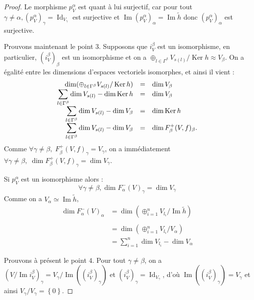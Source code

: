 \documentclass[a4paper,11pt]{article}
\DeclareMathOperator{\Ker}{Ker}
\DeclareMathOperator{\Id}{Id}
\DeclareMathOperator{\Img}{Im}
\newcommand{\dps}{\displaystyle}
\begin{document}
\begin{proof}
Le morphisme $p_{V}^{\alpha}$ est quant à lui surjectif, car pour tout $\gamma \neq \alpha, (p_{V}^{\alpha})_{\gamma} = \Id_{V_{\gamma}}$ est surjective et $ \Img (p_{V}^{\alpha})_{\alpha} = \Img \widetilde{h}$ donc $ (p_{V}^{\alpha})_{\alpha}$ est surjective.  

	Prouvons maintenant le point $3$. Supposons que $i_{V}^{\beta}$ est un isomorphisme, en particulier, $(i_{V}^{\beta})_{\beta}$ est un isomorphisme et on a $\oplus_{l\in\Gamma^{\beta}}V_{s(l)}/\Ker h\approx V_{\beta}$. On a égalité entre les dimensions d'espaces vectoriels isomorphes, et ainsi il vient :
	\[
\begin{array}{>{\dps}r>{\dps}l>{\dps}l}
	\dim(\oplus_{l\in\Gamma^{\beta}}V_{s(l)}/\Ker h) &=& \dim V_{\beta}\\
	\sum_{l\in\Gamma^{\beta}}\dim V_{s(l)}-\dim\Ker h &=& \dim V_{\beta}\\
	\sum_{l\in\Gamma^{\beta}}\dim V_{s(l)}-\dim V_{\beta} &=& \dim\Ker h\\
	\sum_{l\in\Gamma^{\beta}}\dim V_{s(l)}-\dim V_{\beta} &=& \dim F_{\beta}^{+}(V,f)_{\beta}.\\
\end{array}
	\]
	Comme $\forall \gamma\neq\beta,\;F_{\beta}^{+}(V,f)_{\gamma}=V_{\gamma}$, on a immédiatement $\forall \gamma\neq\beta,\;\dim F_{\beta}^{+}(V,f)_{\gamma}=\dim V_{\gamma}$.

        Si $p_{V}^{\alpha}$ est un isomorphisme alors : 
        \[
        \forall \gamma \neq \beta, \dim F_{\alpha}^{-}(V)_{\gamma} = \dim V_{\gamma}
        \]
        Comme on a $V_{\alpha} \simeq \Img \widetilde{h}$,
        \[
        \begin{array}{rl}
        \dim F_{\alpha}^{-}(V)_{\alpha} &= \dim\left( \oplus_{i=1}^{n} V_{l_{i}} / \Img \widetilde{h} \right) \\ \\
                                        &= \dim\left( \oplus_{i=1}^{n} V_{l_{i}} / V_{\alpha} \right) \\
                                        &= \sum_{i=1}^{n} \dim V_{l_{i}} - \dim V_{\alpha}
\end{array}
        \]


	Prouvons à présent le point $4$. Pour tout $\gamma\neq\beta$, on a $(V/\Img i_{V}^{\beta})_{\gamma}=V_{\gamma}/\Img((i_{V}^{\beta})_{\gamma})$ et $(i_{V}^{\beta})_{\gamma}=\Id_{V_{\gamma}}$, d'où $\Img((i_{V}^{\beta})_{\gamma})=V_{\gamma}$ et ainsi $V_{\gamma}/V_{\gamma}=\left\{ 0 \right\}$.


\end{proof}
\end{document}
